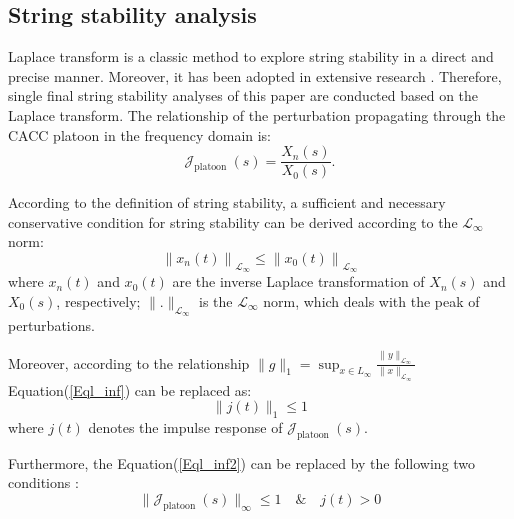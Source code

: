 \documentclass[journal]{IEEEtran}
\begin{document}
\subsection{String stability analysis}
\label{Section 3.1}

Laplace transform is a classic method to explore string stability in a direct and precise manner. Moreover, it has been adopted in extensive research \citep{orosz2011delayed,montanino2021string,feng2019string}. Therefore, single final string stability analyses of this paper are conducted based on the Laplace transform. The relationship of the perturbation propagating through the CACC platoon in the frequency domain is:
\begin{equation}
  \mathcal{J}_{\text {platoon }}(s)=\frac{X_{n}(s)}{X_{0}(s)}.
\end{equation}

According to the definition of string stability, a sufficient and necessary conservative condition for string stability can be derived according to the $\mathcal{L}_{\infty}$ norm:
\begin{equation}
  \left\|x_{n}(t)\right\|_{\mathcal{L}_{\infty}} \leq \left\|x_{0}(t)\right\|_{\mathcal{L}_{\infty}}
  \label{Eql_inf}
\end{equation}
where $x_{n}(t)$ and $x_{0}(t)$ are the inverse Laplace transformation of $X_{n}(s)$ and $X_{0}(s)$, respectively; $\|.\|_{\mathcal{L}_{\infty}}$ is the $\mathcal{L}_{\infty}$ norm, which deals with the peak of perturbations.

Moreover, according to the relationship $\|g\|_{1}=\sup _{x \in L_{\infty}} \frac{\|y\|_{\mathcal{L}_{\infty}}}{\|x\|_{\mathcal{L}_{\infty}}}$ Equation(\ref{Eql_inf}) can be replaced as:
\begin{equation}
  \|j\left(t\right)\|_{1}\leq 1
  \label{Eql_inf2}
\end{equation}
where $j\left(t\right)$ denotes the impulse response of $\mathcal{J}_{\text {platoon }}(s)$.

Furthermore, the Equation(\ref{Eql_inf2}) can be replaced by the following two conditions \citep{Swaroop1994}:
\begin{equation}
  \|\mathcal{J}_{\text {platoon }}(s)\|_{\infty} \leq 1 \quad \& \quad j\left(t\right)>0
  \label{Eql_inf3}
\end{equation}
\end{document}
